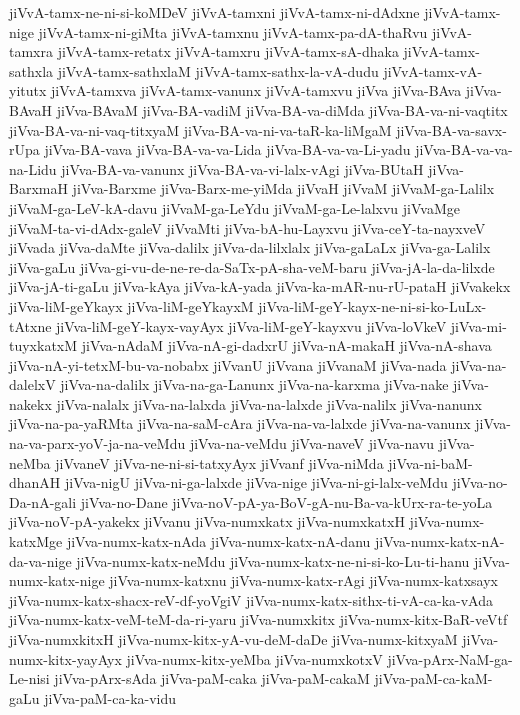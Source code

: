 {jiVvA-tamx-ne-ni-si-koMDeV
jiVvA-tamxni
jiVvA-tamx-ni-dAdxne
jiVvA-tamx-nige
jiVvA-tamx-ni-giMta
jiVvA-tamxnu
jiVvA-tamx-pa-dA-thaRvu
jiVvA-tamxra
jiVvA-tamx-retatx
jiVvA-tamxru
jiVvA-tamx-sA-dhaka
jiVvA-tamx-sathxla
jiVvA-tamx-sathxlaM
jiVvA-tamx-sathx-la-vA-dudu
jiVvA-tamx-vA-yitutx
jiVvA-tamxva
jiVvA-tamx-vanunx
jiVvA-tamxvu
jiVva
jiVva-BAva
jiVva-BAvaH
jiVva-BAvaM
jiVva-BA-vadiM
jiVva-BA-va-diMda
jiVva-BA-va-ni-vaqtitx
jiVva-BA-va-ni-vaq-titxyaM
jiVva-BA-va-ni-va-taR-ka-liMgaM
jiVva-BA-va-savx-rUpa
jiVva-BA-vava
jiVva-BA-va-va-Lida
jiVva-BA-va-va-Li-yadu
jiVva-BA-va-va-na-Lidu
jiVva-BA-va-vanunx
jiVva-BA-va-vi-lalx-vAgi
jiVva-BUtaH
jiVva-BarxmaH
jiVva-Barxme
jiVva-Barx-me-yiMda
jiVvaH
jiVvaM
jiVvaM-ga-Lalilx
jiVvaM-ga-LeV-kA-davu
jiVvaM-ga-LeYdu
jiVvaM-ga-Le-lalxvu
jiVvaMge
jiVvaM-ta-vi-dAdx-galeV
jiVvaMti
jiVva-bA-hu-Layxvu
jiVva-ceY-ta-nayxveV
jiVvada
jiVva-daMte
jiVva-dalilx
jiVva-da-lilxlalx
jiVva-gaLaLx
jiVva-ga-Lalilx
jiVva-gaLu
jiVva-gi-vu-de-ne-re-da-SaTx-pA-sha-veM-baru
jiVva-jA-la-da-lilxde
jiVva-jA-ti-gaLu
jiVva-kAya
jiVva-kA-yada
jiVva-ka-mAR-nu-rU-pataH
jiVvakekx
jiVva-liM-geYkayx
jiVva-liM-geYkayxM
jiVva-liM-geY-kayx-ne-ni-si-ko-LuLx-tAtxne
jiVva-liM-geY-kayx-vayAyx
jiVva-liM-geY-kayxvu
jiVva-loVkeV
jiVva-mi-tuyxkatxM
jiVva-nAdaM
jiVva-nA-gi-dadxrU
jiVva-nA-makaH
jiVva-nA-shava
jiVva-nA-yi-tetxM-bu-va-nobabx
jiVvanU
jiVvana
jiVvanaM
jiVva-nada
jiVva-na-dalelxV
jiVva-na-dalilx
jiVva-na-ga-Lanunx
jiVva-na-karxma
jiVva-nake
jiVva-nakekx
jiVva-nalalx
jiVva-na-lalxda
jiVva-na-lalxde
jiVva-nalilx
jiVva-nanunx
jiVva-na-pa-yaRMta
jiVva-na-saM-cAra
jiVva-na-va-lalxde
jiVva-na-vanunx
jiVva-na-va-parx-yoV-ja-na-veMdu
jiVva-na-veMdu
jiVva-naveV
jiVva-navu
jiVva-neMba
jiVvaneV
jiVva-ne-ni-si-tatxyAyx
jiVvanf
jiVva-niMda
jiVva-ni-baM-dhanAH
jiVva-nigU
jiVva-ni-ga-lalxde
jiVva-nige
jiVva-ni-gi-lalx-veMdu
jiVva-no-Da-nA-gali
jiVva-no-Dane
jiVva-noV-pA-ya-BoV-gA-nu-Ba-va-kUrx-ra-te-yoLa
jiVva-noV-pA-yakekx
jiVvanu
jiVva-numxkatx
jiVva-numxkatxH
jiVva-numx-katxMge
jiVva-numx-katx-nAda
jiVva-numx-katx-nA-danu
jiVva-numx-katx-nA-da-va-nige
jiVva-numx-katx-neMdu
jiVva-numx-katx-ne-ni-si-ko-Lu-ti-hanu
jiVva-numx-katx-nige
jiVva-numx-katxnu
jiVva-numx-katx-rAgi
jiVva-numx-katxsayx
jiVva-numx-katx-shacx-reV-df-yoVgiV
jiVva-numx-katx-sithx-ti-vA-ca-ka-vAda
jiVva-numx-katx-veM-teM-da-ri-yaru
jiVva-numxkitx
jiVva-numx-kitx-BaR-veVtf
jiVva-numxkitxH
jiVva-numx-kitx-yA-vu-deM-daDe
jiVva-numx-kitxyaM
jiVva-numx-kitx-yayAyx
jiVva-numx-kitx-yeMba
jiVva-numxkotxV
jiVva-pArx-NaM-ga-Le-nisi
jiVva-pArx-sAda
jiVva-paM-caka
jiVva-paM-cakaM
jiVva-paM-ca-kaM-gaLu
jiVva-paM-ca-ka-vidu
}
